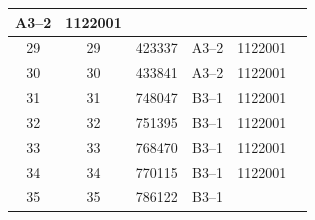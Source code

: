 \documentclass[UTF8,10pt,a4paper,fontset=fandol]{ctexart}
\newcommand{\fieldvalue}[1]{#1}
\begin{document}
\begin{center}
\begin{tabularx}{\textwidth}{|c|c|c|c|c|X|}
\fieldvalue{A3--2} &
\fieldvalue{1122001} & \\
\hline
29 &
\fieldvalue{29} &
\fieldvalue{423337} &
\fieldvalue{A3--2} &
\fieldvalue{1122001} & \\
\hline
30 &
\fieldvalue{30} &
\fieldvalue{433841} &
\fieldvalue{A3--2} &
\fieldvalue{1122001} & \\
\hline
31 &
\fieldvalue{31} &
\fieldvalue{748047} &
\fieldvalue{B3--1} &
\fieldvalue{1122001} & \\
\hline
32 &
\fieldvalue{32} &
\fieldvalue{751395} &
\fieldvalue{B3--1} &
\fieldvalue{1122001} & \\
\hline
33 &
\fieldvalue{33} &
\fieldvalue{768470} &
\fieldvalue{B3--1} &
\fieldvalue{1122001} & \\
\hline
34 &
\fieldvalue{34} &
\fieldvalue{770115} &
\fieldvalue{B3--1} &
\fieldvalue{1122001} & \\
\hline
35 &
\fieldvalue{35} &
\fieldvalue{786122} &
\fieldvalue{B3--1} &

\end{tabularx}
\end{center}
\end{document}
